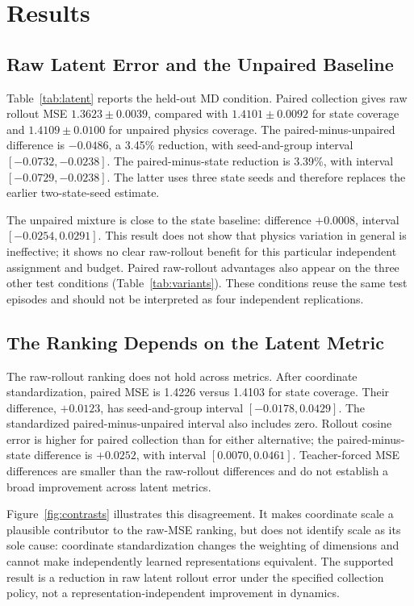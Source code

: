 \section{Results}
\subsection{Raw Latent Error and the Unpaired Baseline}
Table~\ref{tab:latent} reports the held-out MD condition. Paired collection gives raw rollout MSE $1.3623\pm0.0039$, compared with $1.4101\pm0.0092$ for state coverage and $1.4109\pm0.0100$ for unpaired physics coverage. The paired-minus-unpaired difference is $-0.0486$, a 3.45\% reduction, with seed-and-group interval $[-0.0732,-0.0238]$. The paired-minus-state reduction is 3.39\%, with interval $[-0.0729,-0.0238]$. The latter uses three state seeds and therefore replaces the earlier two-state-seed estimate.

The unpaired mixture is close to the state baseline: difference $+0.0008$, interval $[-0.0254,0.0291]$. This result does not show that physics variation in general is ineffective; it shows no clear raw-rollout benefit for this particular independent assignment and budget. Paired raw-rollout advantages also appear on the three other test conditions (Table~\ref{tab:variants}). These conditions reuse the same test episodes and should not be interpreted as four independent replications.





\subsection{The Ranking Depends on the Latent Metric}
The raw-rollout ranking does not hold across metrics. After coordinate standardization, paired MSE is 1.4226 versus 1.4103 for state coverage. Their difference, $+0.0123$, has seed-and-group interval $[-0.0178,0.0429]$. The standardized paired-minus-unpaired interval also includes zero. Rollout cosine error is higher for paired collection than for either alternative; the paired-minus-state difference is $+0.0252$, with interval $[0.0070,0.0461]$. Teacher-forced MSE differences are smaller than the raw-rollout differences and do not establish a broad improvement across latent metrics.

Figure~\ref{fig:contrasts} illustrates this disagreement. It makes coordinate scale a plausible contributor to the raw-MSE ranking, but does not identify scale as its sole cause: coordinate standardization changes the weighting of dimensions and cannot make independently learned representations equivalent. The supported result is a reduction in raw latent rollout error under the specified collection policy, not a representation-independent improvement in dynamics.

